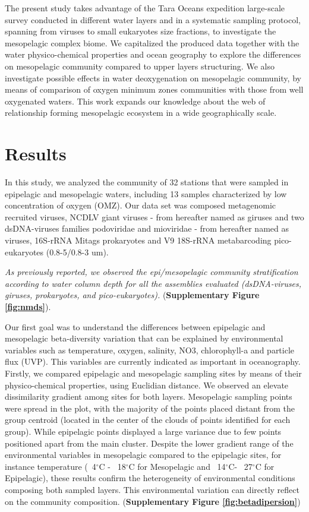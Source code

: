 \documentclass[fleqn,10pt]{wlscirep}
\begin{document}
The present study takes advantage of the Tara Oceans expedition large-scale survey conducted in different water layers and in a systematic sampling protocol, spanning from viruses to small eukaryotes size fractions, to investigate the mesopelagic complex biome. We capitalized the produced data together with the water physico-chemical properties and ocean geography to explore the differences on mesopelagic community compared to upper layers structuring. We also investigate possible effects in water deoxygenation on mesopelagic community, by means of comparison of oxygen minimum zones communities with those from well oxygenated waters. This work expands our knowledge about the web of relationship forming mesopelagic ecosystem in a wide geographically scale.

\section*{Results}

In this study, we analyzed the community of 32 stations that were sampled in epipelagic and mesopelagic waters, including 13 samples characterized by low concentration of oxygen (OMZ). Our data set was composed metagenomic recruited viruses, NCDLV giant viruses - from hereafter named as giruses and two dsDNA-viruses families podoviridae and mioviridae - from hereafter named as viruses, 16S-rRNA Mitags prokaryotes and V9 18S-rRNA metabarcoding pico-eukaryotes (0.8-5/0.8-3 um).

\textit{As previously reported, we observed the epi/mesopelagic community stratification according to water column depth for all the assemblies evaluated (dsDNA-viruses, giruses, prokaryotes, and pico-eukaryotes).}  (\textbf{Supplementary Figure \ref{fig:nmds}}). %

Our first goal was to understand the differences between epipelagic and mesopelagic beta-diversity variation that can be explained by environmental variables such as temperature, oxygen, salinity, NO3, chlorophyll-a and particle flux (UVP). This variables are currently indicated as important in oceanography. Firstly, we compared epipelagic and mesopelagic sampling sites by means of their physico-chemical properties, using Euclidian distance. We observed an elevate dissimilarity gradient among sites for both layers. Mesopelagic sampling points were spread in the plot, with the majority of the points placed distant from the group centroid (located in the center of the clouds of points identified for each group). While epipelagic points displayed a large variance due to few points positioned apart from the main cluster. Despite the lower gradient range of the environmental variables in mesopelagic compared to the epipelagic sites, for instance temperature (~4$^{\circ}$C - ~18$^{\circ}$C for Mesopelagic and ~14$^{\circ}$C- ~27$^{\circ}$C for Epipelagic), these results confirm the heterogeneity of environmental conditions composing both sampled layers. This environmental variation can directly reflect on the community composition.  (\textbf{Supplementary Figure \ref{fig:betadipersion}})
\end{document}

